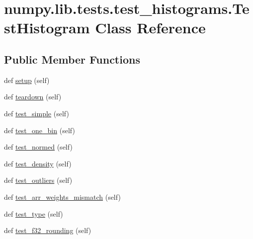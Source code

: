 \hypertarget{classnumpy_1_1lib_1_1tests_1_1test__histograms_1_1TestHistogram}{}\section{numpy.\+lib.\+tests.\+test\+\_\+histograms.\+Test\+Histogram Class Reference}
\label{classnumpy_1_1lib_1_1tests_1_1test__histograms_1_1TestHistogram}
\subsection*{Public Member Functions}
\begin{DoxyCompactItemize}
\item 
def \hyperlink{classnumpy_1_1lib_1_1tests_1_1test__histograms_1_1TestHistogram_ab7a8adc6efd82459ee6d83c1800c788f}{setup} (self)
\item 
def \hyperlink{classnumpy_1_1lib_1_1tests_1_1test__histograms_1_1TestHistogram_ac8916ef92d675dff831df40a1bd197a7}{teardown} (self)
\item 
def \hyperlink{classnumpy_1_1lib_1_1tests_1_1test__histograms_1_1TestHistogram_a9cc359b6c7a556e3c5433129a3704ac2}{test\+\_\+simple} (self)
\item 
def \hyperlink{classnumpy_1_1lib_1_1tests_1_1test__histograms_1_1TestHistogram_a308386cc23ff1ce9209134f9ebe1205b}{test\+\_\+one\+\_\+bin} (self)
\item 
def \hyperlink{classnumpy_1_1lib_1_1tests_1_1test__histograms_1_1TestHistogram_affd7b20b49368f365eaa2fb1e6805df1}{test\+\_\+normed} (self)
\item 
def \hyperlink{classnumpy_1_1lib_1_1tests_1_1test__histograms_1_1TestHistogram_a833dc493a5615df473f763218d0ea7fd}{test\+\_\+density} (self)
\item 
def \hyperlink{classnumpy_1_1lib_1_1tests_1_1test__histograms_1_1TestHistogram_a84c6b682fb8aa57bd2757b5110fa4b24}{test\+\_\+outliers} (self)
\item 
def \hyperlink{classnumpy_1_1lib_1_1tests_1_1test__histograms_1_1TestHistogram_a48084f8af90dc62ea4157417f5086078}{test\+\_\+arr\+\_\+weights\+\_\+mismatch} (self)
\item 
def \hyperlink{classnumpy_1_1lib_1_1tests_1_1test__histograms_1_1TestHistogram_aef78e45e7b9a14e468cd4808505d69b5}{test\+\_\+type} (self)
\item 
def \hyperlink{classnumpy_1_1lib_1_1tests_1_1test__histograms_1_1TestHistogram_a921fe2e26b5b9ec6c93d1e351be66a44}{test\+\_\+f32\+\_\+rounding} (self)

\end{DoxyCompactItemize}
